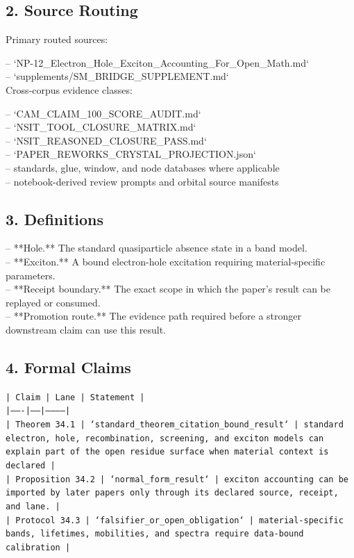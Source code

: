 \documentclass[11pt]{article}
\begin{document}
\subsection*{2. Source Routing}

Primary routed sources:

\noindent{}-- `NP-12\_Electron\_Hole\_Exciton\_Accounting\_For\_Open\_Math.md`\\
\noindent{}-- `supplements/SM\_BRIDGE\_SUPPLEMENT.md`\\

Cross-corpus evidence classes:

\noindent{}-- `CAM\_CLAIM\_100\_SCORE\_AUDIT.md`\\
\noindent{}-- `NSIT\_TOOL\_CLOSURE\_MATRIX.md`\\
\noindent{}-- `NSIT\_REASONED\_CLOSURE\_PASS.md`\\
\noindent{}-- `PAPER\_REWORKS\_CRYSTAL\_PROJECTION.json`\\
\noindent{}-- standards, glue, window, and node databases where applicable\\
\noindent{}-- notebook-derived review prompts and orbital source manifests\\

\subsection*{3. Definitions}

\noindent{}-- **Hole.** The standard quasiparticle absence state in a band model.\\
\noindent{}-- **Exciton.** A bound electron-hole excitation requiring material-specific parameters.\\
\noindent{}-- **Receipt boundary.** The exact scope in which the paper's result can be replayed or consumed.\\
\noindent{}-- **Promotion route.** The evidence path required before a stronger downstream claim can use this result.\\

\subsection*{4. Formal Claims}

\noindent\texttt{| Claim | Lane | Statement |}\\
\noindent\texttt{|-------|------|-----------|}\\
\noindent\texttt{| Theorem 34.1 | `standard\_theorem\_citation\_bound\_result` | standard electron, hole, recombination, screening, and exciton models can explain part of the open residue surface when material context is declared |}\\
\noindent\texttt{| Proposition 34.2 | `normal\_form\_result` | exciton accounting can be imported by later papers only through its declared source, receipt, and lane. |}\\
\noindent\texttt{| Protocol 34.3 | `falsifier\_or\_open\_obligation` | material-specific bands, lifetimes, mobilities, and spectra require data-bound calibration |}\\
\end{document}
